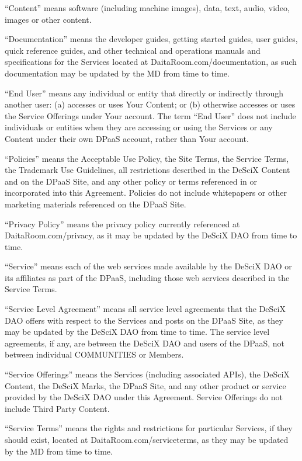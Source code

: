 \documentclass{article}
\begin{document}
“Content” means software (including machine images), data, text, audio, video, images or other content.

“Documentation” means the developer guides, getting started guides, user guides, quick reference guides, and other technical and operations manuals and specifications for the Services located at DaitaRoom.com/documentation, as such documentation may be updated by the MD from time to time.

“End User” means any individual or entity that directly or indirectly through another user: (a) accesses or uses Your Content; or (b) otherwise accesses or uses the Service Offerings under Your account. The term “End User” does not include individuals or entities when they are accessing or using the Services or any Content under their own DPaaS account, rather than Your account.

“Policies” means the Acceptable Use Policy, the Site Terms, the Service Terms, the Trademark Use Guidelines, all restrictions described in the DeSciX Content and on the DPaaS Site, and any other policy or terms referenced in or incorporated into this Agreement. Policies do not include whitepapers or other marketing materials referenced on the DPaaS Site.

“Privacy Policy” means the privacy policy currently referenced at DaitaRoom.com/privacy, as it may be updated by the DeSciX DAO from time to time.

“Service” means each of the web services made available by the DeSciX DAO or its affiliates as part of the DPaaS, including those web services described in the Service Terms.

“Service Level Agreement” means all service level agreements that the DeSciX DAO offers with respect to the Services and posts on the DPaaS Site, as they may be updated by the DeSciX DAO from time to time. The service level agreements, if any, are between the DeSciX DAO and users of the DPaaS, not between individual COMMUNITIES or Members.

“Service Offerings” means the Services (including associated APIs), the DeSciX Content, the DeSciX Marks, the DPaaS Site, and any other product or service provided by the DeSciX DAO under this Agreement. Service Offerings do not include Third Party Content.

“Service Terms” means the rights and restrictions for particular Services, if they should exist, located at DaitaRoom.com/serviceterms, as they may be updated by the MD from time to time.
\end{document}

